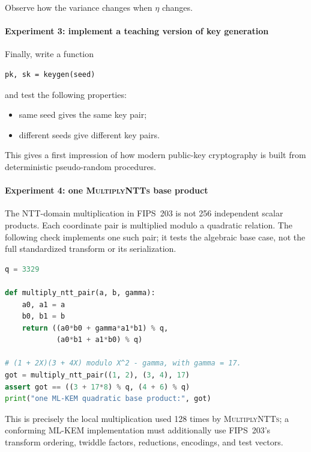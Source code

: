 Observe how the variance changes when \(\eta\) changes.

\paragraph{Experiment 3: implement a teaching version of key generation}

Finally, write a function

\begin{lstlisting}
pk, sk = keygen(seed)
\end{lstlisting}

and test the following properties:

\begin{itemize}
  \item same seed gives the same key pair;
  \item different seeds give different key pairs.
\end{itemize}

This gives a first impression of how modern public-key cryptography is built from deterministic pseudo-random procedures.

\paragraph{Experiment 4: one \textsc{MultiplyNTTs} base product}

The NTT-domain multiplication in FIPS~203 is not 256 independent scalar
products. Each coordinate pair is multiplied modulo a quadratic relation. The
following check implements one such pair; it tests the algebraic base case, not
the full standardized transform or its serialization.

\begin{lstlisting}[language=Python]
q = 3329

def multiply_ntt_pair(a, b, gamma):
    a0, a1 = a
    b0, b1 = b
    return ((a0*b0 + gamma*a1*b1) % q,
            (a0*b1 + a1*b0) % q)

# (1 + 2X)(3 + 4X) modulo X^2 - gamma, with gamma = 17.
got = multiply_ntt_pair((1, 2), (3, 4), 17)
assert got == ((3 + 17*8) % q, (4 + 6) % q)
print("one ML-KEM quadratic base product:", got)
\end{lstlisting}

This is precisely the local multiplication used 128 times by
\textsc{MultiplyNTTs}; a conforming ML-KEM implementation must additionally
use FIPS~203's transform ordering, twiddle factors, reductions, encodings, and
test vectors.

